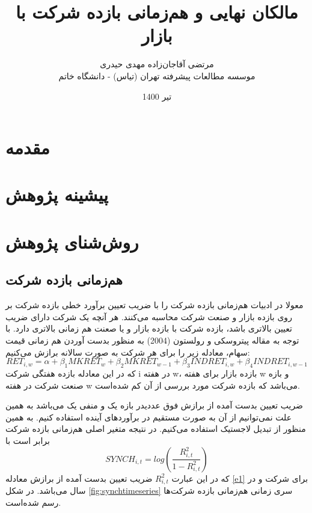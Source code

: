 \documentclass[12pt, a4paper]{article}
\title{مالکان نهایی و هم‌زمانی بازده شرکت با بازار}
\author{
	مرتضی آقاجان‌زاده
	 \sym{*} 
	\qquad 
	مهدی حیدری 
	\sym{*} 
	 \\
	\sym{*} 
	\footnotesize  موسسه مطالعات پیشرفته تهران (تیاس) - دانشگاه خاتم
}
\date{
تیر 1400}
\begin{document}
\maketitle

\section{مقدمه}
\section{پیشینه پژوهش}
\section{روش‌شنای پژوهش}
\subsection{هم‌زمانی بازده شرکت}
معولا در ادبیات هم‌زمانی بازده شرکت را با ضریب تعیین برآورد خطی بازده شرکت بر روی بازده بازار و صنعت شرکت محاسبه می‌کنند. هر آنچه یک شرکت دارای ضریب تعیین بالاتری باشد، بازده شرکت با بازده بازار و یا صعنت هم زمانی بالاتری دارد. 
با توجه به مقاله 
پیتروسکی و رولستون (2004)
به منظور بدست آوردن هم زمانی قیمت سهام، معادله زیر را برای هر شرکت به صورت سالانه برازش می‌کنیم:
	\begin{equation}\label{e1}
		RET_{i,w} = \alpha + \beta_1 MKRET_{w}+ \beta_2 MKRET_{w-1}  + \beta_3 INDRET_{i,w} + \beta_4 INDRET_{i,w-1} 
	\end{equation}
	که در این معادله 
	بازده هفتگی شرکت i در هفته w، 
	بازده بازار برای هفته w و
	بازه صنعت شرکت در هفته w می‌باشد که بازده شرکت مورد بررسی از آن کم شده‌است. 
	
	ضریب تعیین بدست آمده از برازش فوق عددیدر بازه یک و منفی یک می‌باشد به همین علت نمی‌توانیم از آن به صورت مستقیم در برآورد‌های آینده استفاده کنیم. به همین منظور از تبدیل لاجستیک استفاده می‌کنیم. در نتیجه متغیر اصلی هم‌زمانی بازده شرکت برابر است با 	
	\begin{equation}
		SYNCH_{i,t} = log(\frac{R^2_{i,t}}{1-R^2_{i,t}})
	\end{equation}
که در این عبارت $  R^2_{i,t}$ ضریب تعیین بدست آمده از برازش معادله 
\ref{e1}
برای شرکت
  و در سال
  می‌باشد. در شکل
  \ref{fig:synchtimeseries} 
  سری زمانی هم‌زمانی بازده شرکت‌ها رسم شده‌است.
  
\end{document}
